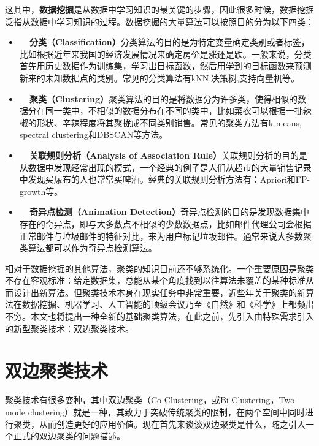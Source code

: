 \vspace{2mm}
这其中，\textbf{数据挖掘}是从数据中学习知识的最关键的步骤，因此很多时候，数据挖掘泛指从数据中学习知识的过程。数据挖掘的大量算法可以按照目的分为以下四类：

\begin{itemize}
    \item \textbf{~~分类（Classification）}分类算法的目的是为特定变量确定类别或者标签，比如根据近年来我国的经济发展情况来确定房价是涨还是跌。一般来说，分类首先用历史数据作为训练集，学习出目标函数，然后用学到的目标函数来预测新来的未知数据点的类别。常见的分类算法有kNN,决策树,支持向量机等。
    \item \textbf{~~聚类（Clustering）}聚类算法的目的是将数据分为许多类，使得相似的数据分在同一类中，不相似的数据分布在不同的类中，比如菜农可以根据一批辣椒的形状、辛辣程度将其聚拢成不同类别销售。常见的聚类方法有k-means, spectral clustering和DBSCAN等方法。
    \item \textbf{~~关联规则分析（Analysis of Association Rule）}关联规则分析的目的是从数据中发现经常出现的模式，一个经典的例子是人们从超市的大量销售记录中发现买尿布的人也常常买啤酒。经典的关联规则分析方法有：Apriori和FP-growth等。
    \item \textbf{~~奇异点检测（Animation Detection）}奇异点检测的目的是发现数据集中存在的奇异点，即与大多数点不相似的少数数据点，比如邮件代理公司会根据正常邮件与垃圾邮件的特征对比，来为用户标记垃圾邮件。通常来说大多数聚类算法都可以作为奇异点检测算法。
\end{itemize}

\vspace{2mm}
相对于数据挖掘的其他算法，聚类的知识目前还不够系统化。一个重要原因是聚类不存在客观标准：给定数据集，总能从某个角度找到以往算法未覆盖的某种标准从而设计出新算法。但聚类技术本身在现实任务中非常重要，近些年关于聚类的新算法在数据挖掘、机器学习、人工智能的顶级会议乃至《自然》和《科学》上都频出不穷。本文也将提出一种全新的基础聚类算法，在此之前，先引入由特殊需求引入的新型聚类技术：双边聚类技术。



\section{双边聚类技术}
聚类技术有很多变种，其中双边聚类（Co-Clustering，或Bi-Clustering，Two-mode clustering）就是一种，其致力于突破传统聚类的限制，在两个空间中同时进行聚类，从而创造更好的应用价值。现在首先来谈谈双边聚类是什么，随之引入一个正式的双边聚类的问题描述。

